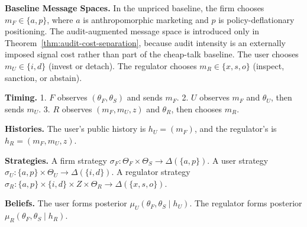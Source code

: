 \documentclass[preprint,authoryear]{elsarticle}
\theoremstyle{definition}
\theoremstyle{plain}
\begin{document}
\textbf{Baseline Message Spaces.} In the unpriced baseline, the firm chooses $m_F \in \{a,p\}$, where $a$ is anthropomorphic marketing and $p$ is policy-deflationary positioning. The audit-augmented message space is introduced only in Theorem~\ref{thm:audit-cost-separation}, because audit intensity is an externally imposed signal cost rather than part of the cheap-talk baseline. The user chooses $m_U \in \{i,d\}$ (invest or detach). The regulator chooses $m_R \in \{x,s,o\}$ (inspect, sanction, or abstain).

\textbf{Timing.} 
1. $F$ observes $(\theta_F,\theta_S)$ and sends $m_F$.
2. $U$ observes $m_F$ and $\theta_U$, then sends $m_U$.
3. $R$ observes $(m_F,m_U,z)$ and $\theta_R$, then chooses $m_R$.

\textbf{Histories.} The user's public history is $h_U = (m_F)$, and the regulator's is $h_R = (m_F, m_U, z)$.

\textbf{Strategies.} A firm strategy $\sigma_F: \Theta_F \times \Theta_S \to \Delta(\{a,p\})$. A user strategy $\sigma_U: \{a,p\} \times \Theta_U \to \Delta(\{i,d\})$. A regulator strategy $\sigma_R: \{a,p\} \times \{i,d\} \times Z \times \Theta_R \to \Delta(\{x,s,o\})$.

\textbf{Beliefs.} The user forms posterior $\mu_U(\theta_F, \theta_S \mid h_U)$. The regulator forms posterior $\mu_R(\theta_F, \theta_S \mid h_R)$.
\end{document}
